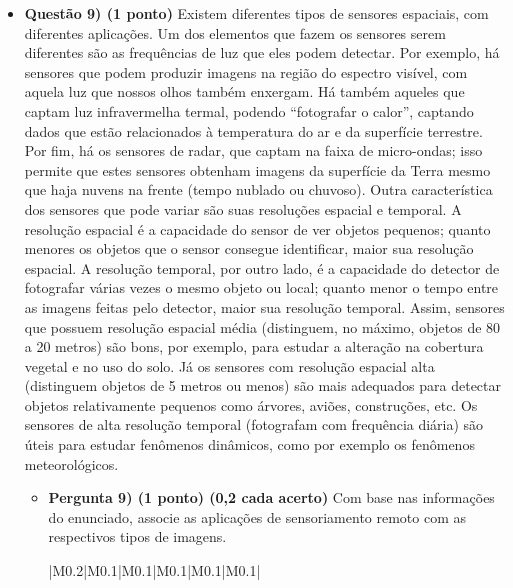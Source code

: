\documentclass[a4paper, 12pt]{article}
\begin{document}
\begin{flushleft}
\begin{itemize}
            \item \textbf{Questão 9) (1 ponto)} Existem diferentes tipos de sensores espaciais, com diferentes aplicações. \linebreak \linebreak Um dos elementos que fazem os sensores serem diferentes são as frequências de luz que eles podem detectar. Por exemplo, há sensores que podem produzir imagens na região do espectro visível, com aquela luz que nossos olhos também enxergam. Há também aqueles que captam luz infravermelha termal, podendo “fotografar o calor”, captando dados que estão relacionados à temperatura do ar e da superfície terrestre. Por fim, há os sensores de radar, que captam na faixa de micro-ondas; isso permite que estes sensores obtenham imagens da superfície da Terra mesmo que haja nuvens na frente (tempo nublado ou chuvoso). \linebreak \linebreak Outra característica dos sensores que pode variar são suas resoluções espacial e temporal. A resolução espacial é a capacidade do sensor de ver objetos pequenos; quanto menores os objetos que o sensor consegue identificar, maior sua resolução espacial. A resolução temporal, por outro lado, é a capacidade do detector de fotografar várias vezes o mesmo objeto ou local; quanto menor o tempo entre as imagens feitas pelo detector, maior sua resolução temporal. \linebreak \linebreak Assim, sensores que possuem resolução espacial média (distinguem, no máximo, objetos de 80 a 20 metros) são bons, por exemplo, para estudar a alteração na cobertura vegetal e no uso do solo. Já os sensores com resolução espacial alta (distinguem objetos de 5 metros ou menos) são mais adequados para detectar objetos relativamente pequenos como árvores, aviões, construções, etc. Os sensores de alta resolução temporal (fotografam com frequência diária) são úteis para estudar fenômenos dinâmicos, como por exemplo os fenômenos meteorológicos.
                \begin{itemize}
                    \item \textbf{Pergunta 9) (1 ponto) (0,2 cada acerto)} Com base nas informações do enunciado, associe as aplicações de sensoriamento remoto com as respectivos tipos de imagens.
                        \begin{center} \begin{tabular}
                        {
                            |M{0.2\textwidth}|M{0.1\textwidth}|M{0.1\textwidth}|M{0.1\textwidth}|M{0.1\textwidth}|M{0.1\textwidth}|
}
\end{tabular}
\end{center}
\end{itemize}
\end{itemize}
\end{flushleft}
\end{document}
